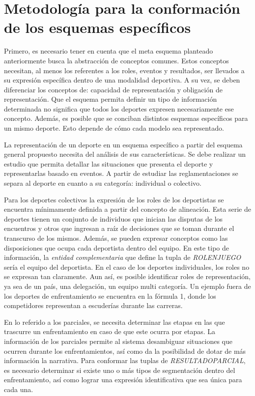 
\section{Metodología para la conformación de los esquemas específicos}

    Primero, es necesario tener en cuenta que el meta esquema planteado anteriormente busca la abstracción de conceptos comunes. Estos 
conceptos necesitan, al menos los referentes a los roles, eventos y resultados, ser llevados a su expresión específica dentro de una modalidad 
deportiva. A su vez, se deben diferenciar los conceptos de: capacidad de representación y obligación de representación. Que el esquema permita definir 
un tipo de información determinada no significa que todos los deportes expresen necesariamente ese concepto. Además, es posible que se conciban distintos 
esquemas específicos para un mismo deporte. Esto depende de cómo cada modelo sea representado.

    La representación de un deporte en un esquema específico a partir del esquema general propuesto necesita del análisis de sus características. 
Se debe realizar un estudio que permita detallar las situaciones que presenta el deporte y representarlas basado en eventos. A partir de 
estudiar las reglamentaciones se separa al deporte en cuanto a su categoría: individual o colectivo. 

    Para los deportes colectivos la expresión de los roles de los deportistas se encuentra mínimamente definida a partir del concepto de 
alineación. Esta serie de deportes tienen un conjunto de individuos que inician las disputas de los encuentros y otros que ingresan a raíz de decisiones 
que se toman durante el transcurso de los mismos. Además, se pueden expresar conceptos como las disposiciones que ocupa cada deportista dentro del equipo. En este 
tipo de información, la \textit{entidad complementaria} que define la tupla de \textit{ROLENJUEGO} sería el equipo del deportista.
    En el caso de los deportes individuales, los roles no se expresan tan claramente. Aun así, es posible identificar roles de representación, ya sea de un 
país, una delegación, un equipo multi categoría. Un ejemplo fuera de los deportes de enfrentamiento se encuentra en la fórmula 1, donde los competidores 
representan a escuderías durante las carreras.

    En lo referido a los parciales, se necesita determinar las etapas en las que trascurre un enfrentamiento en caso de que este ocurra por etapas. La información 
de los parciales permite al sistema desambiguar situaciones que ocurren durante los enfrentamientos, así como da la posibilidad de dotar de más información 
la narrativa. Para conformar las tuplas de \textit{RESULTADOPARCIAL}, es necesario determinar si existe uno o m\'as tipos de segmentación dentro del enfrentamiento, así como 
lograr una expresión identificativa que sea única para cada una.


